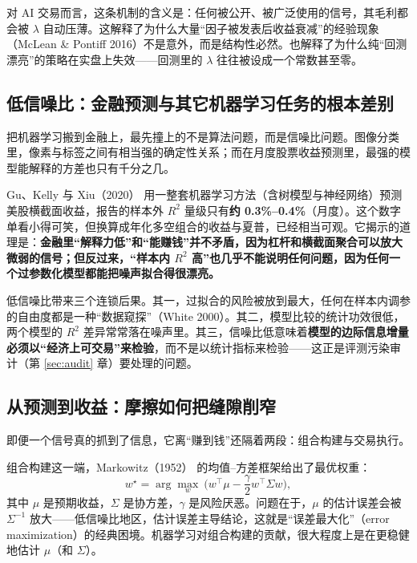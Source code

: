 对 AI 交易而言，这条机制的含义是：任何被公开、被广泛使用的信号，其毛利都会被 $\lambda$ 自动压薄。这解释了为什么大量“因子被发表后收益衰减”的经验现象（McLean \& Pontiff 2016\cite{mcleanpontiff2016}）不是意外，而是结构性必然。也解释了为什么纯“回测漂亮”的策略在实盘上失效——回测里的 $\lambda$ 往往被设成一个常数甚至零。

\subsection{低信噪比：金融预测与其它机器学习任务的根本差别}

把机器学习搬到金融上，最先撞上的不是算法问题，而是信噪比问题。图像分类里，像素与标签之间有相当强的确定性关系；而在月度股票收益预测里，最强的模型能解释的方差也只有千分之几。

Gu、Kelly 与 Xiu（2020）\cite{gukellyxiu2020} 用一整套机器学习方法（含树模型与神经网络）预测美股横截面收益，报告的样本外 $R^2$ 量级只有\textbf{约 0.3\%--0.4\%}（月度）。这个数字单看小得可笑，但换算成年化多空组合的收益与夏普，已经相当可观。它揭示的道理是：\textbf{金融里“解释力低”和“能赚钱”并不矛盾，因为杠杆和横截面聚合可以放大微弱的信号；但反过来，“样本内 $R^2$ 高”也几乎不能说明任何问题，因为任何一个过参数化模型都能把噪声拟合得很漂亮。}

低信噪比带来三个连锁后果。其一，过拟合的风险被放到最大，任何在样本内调参的自由度都是一种“数据窥探”（White 2000\cite{white2000}）。其二，模型比较的统计功效很低，两个模型的 $R^2$ 差异常常落在噪声里。其三，信噪比低意味着\textbf{模型的边际信息增量必须以“经济上可交易”来检验}，而不是以统计指标来检验——这正是评测污染审计（第 \ref{sec:audit} 章）要处理的问题。

\subsection{从预测到收益：摩擦如何把缝隙削窄}

即便一个信号真的抓到了信息，它离“赚到钱”还隔着两段：组合构建与交易执行。

组合构建这一端，Markowitz（1952）\cite{markowitz1952} 的均值--方差框架给出了最优权重：
\begin{equation}
  w^\star = \arg\max_{w}\ \Big( w^\top \mu - \frac{\gamma}{2} w^\top \Sigma w \Big),
\end{equation}
其中 $\mu$ 是预期收益，$\Sigma$ 是协方差，$\gamma$ 是风险厌恶。问题在于，$\mu$ 的估计误差会被 $\Sigma^{-1}$ 放大——低信噪比地区，估计误差主导结论，这就是“误差最大化”（error maximization）的经典困境。机器学习对组合构建的贡献，很大程度上是在更稳健地估计 $\mu$（和 $\Sigma$）。

